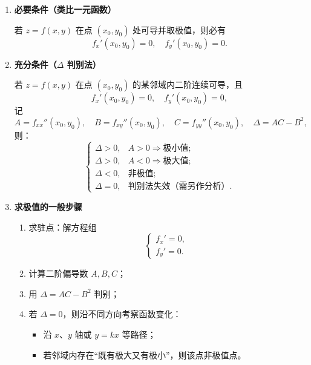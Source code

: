 \begin{enumerate}
    \item \textbf{必要条件（类比一元函数）}

          若 $z = f(x, y)$ 在点 $(x_0, y_0)$ 处可导并取极值，则必有
          \[
              f_x'(x_0, y_0) = 0, \quad f_y'(x_0, y_0) = 0.
          \]

    \item \textbf{充分条件（$\Delta$ 判别法）}

          若 $z = f(x, y)$ 在点 $(x_0, y_0)$ 的某邻域内二阶连续可导，且
          \[
              f_x'(x_0, y_0) = 0, \quad f_y'(x_0, y_0) = 0,
          \]
          记
          \[
              A = f_{xx}''(x_0, y_0), \quad B = f_{xy}''(x_0, y_0), \quad C = f_{yy}''(x_0, y_0), \quad \Delta = AC - B^2,
          \]
          则：
          \[
              \begin{cases}
                  \Delta > 0, & A > 0 \Rightarrow \text{极小值;} \\
                  \Delta > 0, & A < 0 \Rightarrow \text{极大值;} \\
                  \Delta < 0, & \text{非极值;}                   \\
                  \Delta = 0, & \text{判别法失效（需另作分析）.}
              \end{cases}
          \]

    \item \textbf{求极值的一般步骤}

          \begin{enumerate}
              \item 求驻点：解方程组
                    \[
                        \begin{cases}
                            f_x' = 0, \\
                            f_y' = 0.
                        \end{cases}
                    \]
              \item 计算二阶偏导数 $A, B, C$；
              \item 用 $\Delta = AC - B^2$ 判别；
              \item 若 $\Delta = 0$，则沿不同方向考察函数变化：
                    \begin{itemize}
                        \item 沿 $x$、$y$ 轴或 $y=kx$ 等路径；
                        \item 若邻域内存在“既有极大又有极小”，则该点非极值点。
                    \end{itemize}
          \end{enumerate}


\end{enumerate}
